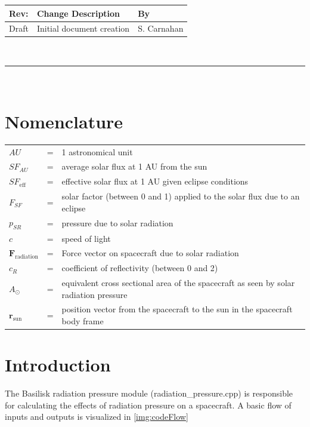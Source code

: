 \documentclass[]{BasiliskReportMemo}
\newcommand{\preparer}{S. Carnahan}
\begin{document}
\makeCover


%
%
\pagestyle{empty}
{\renewcommand{\arraystretch}{1.1}
\noindent
\begin{longtable}{|p{0.5in}|p{4.5in}|p{1.14in}|}
\hline
{\bfseries Rev}: & {\bfseries Change Description} & {\bfseries By} \\
\hline
Draft & Initial document creation & \preparer\\
\hline

\end{longtable}
}

\newpage
\setcounter{page}{1}
\pagestyle{fancy}

\tableofcontents
~\\ \hrule ~\\

	\section*{Nomenclature\\}
	\noindent\begin{tabular}{@{}lcl@{}}
	$AU$ &=& 1 astronomical unit \\
	${SF}_{AU}$ &=& average solar flux at 1 AU from the sun \\
	${SF}_{\mathrm{eff}}$ &=& effective solar flux at 1 AU given eclipse conditions \\
	$F_{SF}$ &=& solar factor (between 0 and 1) applied to the solar flux due to an eclipse\\
	$p_{SR}$ &=& pressure due to solar radiation\\
	$c$  &=&  speed of light\\
	$\mathbf{F}_{\mathrm{radiation}}$  &=&  Force vector on spacecraft due to solar radiation\\
	$c_{R}$ &=& coefficient of reflectivity (between 0 and 2)\\
	$A_{\odot}$ &=& equivalent cross sectional area of the spacecraft as seen by solar radiation pressure \\
	$\mathbf{r}_{\mathrm{sun}}$ &=& position vector from the spacecraft to the sun in the spacecraft body frame \\
	
\end{tabular} 

\pagebreak

\section{Introduction}
The Basilisk radiation pressure module (radiation\_pressure.cpp) is responsible for calculating the effects of radiation pressure on a spacecraft. A basic flow of inputs and outputs is visualized in \ref{img:codeFlow}\\
\end{document}
